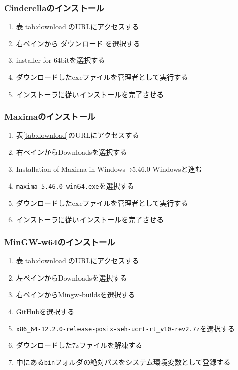 \subsubsection{Cinderellaのインストール}
\begin{enumerate}
    \item 表\ref{tab:download}のURLにアクセスする
    \item 右ペインから ダウンロード を選択する
    \item installer for 64bitを選択する
    \item ダウンロードしたexeファイルを管理者として実行する
    \item インストーラに従いインストールを完了させる
\end{enumerate}

\subsubsection{Maximaのインストール}
\begin{enumerate}
    \item 表\ref{tab:download}のURLにアクセスする
    \item 右ペインからDownloadsを選択する
    \item Installation of Maxima in Windows→5.46.0-Windowsと進む
    \item \verb|maxima-5.46.0-win64.exe|を選択する
    \item ダウンロードしたexeファイルを管理者として実行する
    \item インストーラに従いインストールを完了させる
\end{enumerate}

\subsubsection{MinGW-w64のインストール}
\begin{enumerate}
    \item 表\ref{tab:download}のURLにアクセスする
    \item 左ペインからDownloadsを選択する
    \item 右ペインからMingw-buildsを選択する
    \item GitHubを選択する
    \item \verb|x86_64-12.2.0-release-posix-seh-ucrt-rt_v10-rev2.7z|を選択する
    \item ダウンロードした7zファイルを解凍する
    \item 中にある\verb|bin|フォルダの絶対パスをシステム環境変数として登録する
\end{enumerate}

